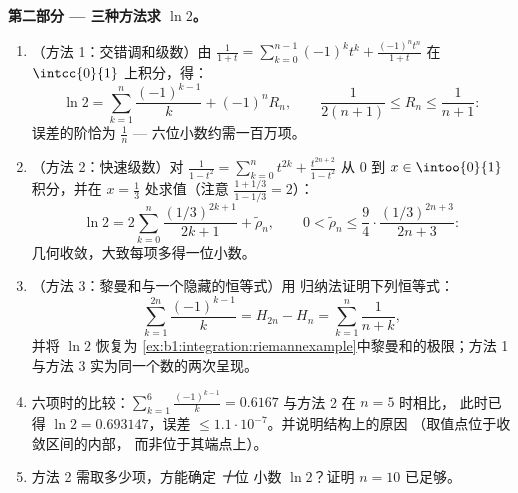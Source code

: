 \begin{problem}
\medskip
\noindent\textbf{第二部分 --- 三种方法求 $\ln 2$。}
\begin{enumerate}[resume]
  \item （方法 1：交错调和级数）由 $\frac{1}{1+t} =
        \sum_{k=0}^{n-1}(-1)^k t^k + \frac{(-1)^n t^n}{1+t}$
        在 $\intcc{0}{1}$ 上积分，得：
        \[
        \ln 2 = \sum_{k=1}^{n} \frac{(-1)^{k-1}}{k} + (-1)^n
        R_n, \qquad \frac{1}{2(n+1)} \leq R_n \leq
        \frac{1}{n+1} :
        \]
        误差的阶恰为 $\frac 1n$ ---
        六位小数约需一百万项。
  \item （方法 2：快速级数）对 $\frac{1}{1 - t^2} =
        \sum_{k=0}^{n} t^{2k} + \frac{t^{2n+2}}{1-t^2}$ 从 $0$
        到 $x \in \intoo{0}{1}$ 积分，并在 $x = \frac13$
        处求值（注意 $\frac{1 + 1/3}{1 - 1/3} = 2$）：
        \[
        \ln 2 = 2\sum_{k=0}^{n} \frac{(1/3)^{2k+1}}{2k+1} +
        \tilde\rho_n,
        \qquad
        0 < \tilde\rho_n \leq \frac{9}{4}\cdot
        \frac{(1/3)^{2n+3}}{2n+3} :
        \]
        几何收敛，大致每项多得一位小数。
  \item （方法 3：黎曼和与一个隐藏的恒等式）用
        归纳法证明下列恒等式：
        \[
        \sum_{k=1}^{2n} \frac{(-1)^{k-1}}{k} = H_{2n} - H_n =
        \sum_{k=1}^{n} \frac{1}{n + k} ,
        \]
        并将 $\ln 2$ 恢复为
        \cref{ex:b1:integration:riemannexample}中黎曼和的极限；方法 1 与方法 3
        实为同一个数的两次呈现。
  \item 六项时的比较：$\sum_{k=1}^{6}
        \frac{(-1)^{k-1}}{k} = 0.6167$ 与方法 2 在 $n = 5$ 时相比，
        此时已得 $\ln 2 = 0.693147$，误差 $\leq
        1.1\cdot10^{-7}$。并说明结构上的原因
        （取值点位于收敛区间的内部，
        而非位于其端点上）。
  \item 方法 2 需取多少项，方能确定 \emph{十}位
        小数 $\ln 2$？证明 $n = 10$ 已足够。
\end{enumerate}


\end{problem}
